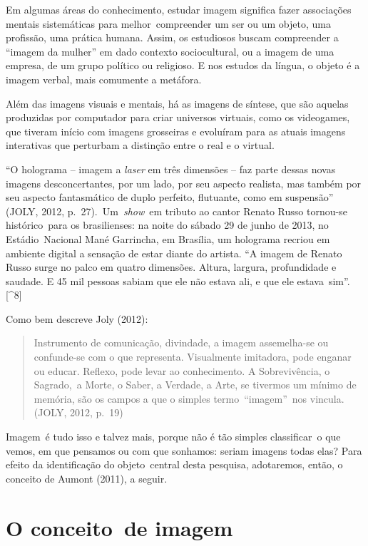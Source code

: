 \documentclass[
  letterpaper,
]{scrbook}
\begin{document}
Em algumas áreas do conhecimento, estudar imagem significa fazer
associações mentais sistemáticas para melhor~compreender um ser ou um
objeto, uma profissão, uma prática humana. Assim, os estudiosos buscam
compreender a ``imagem da mulher'' em dado contexto sociocultural, ou a
imagem de uma empresa, de um grupo político ou religioso. E nos estudos
da língua, o objeto é a imagem verbal, mais comumente a metáfora.~

Além das imagens visuais e mentais, há as imagens de síntese, que são
aquelas produzidas por computador para criar universos virtuais, como os
videogames, que tiveram início com imagens grosseiras e evoluíram para
as atuais imagens interativas que perturbam a distinção entre o real e o
virtual.

``O holograma -- imagem a \emph{laser} em três dimensões -- faz parte
dessas novas imagens desconcertantes, por um lado, por seu aspecto
realista, mas também por seu aspecto fantasmático de duplo perfeito,
flutuante, como em suspensão'' (JOLY, 2012, p.~27).~Um~\emph{show}~em
tributo ao cantor Renato Russo tornou-se histórico~para os brasilienses:
na noite do sábado 29 de junho de 2013, no Estádio~Nacional Mané
Garrincha, em Brasília, um holograma recriou em ambiente digital a
sensação de estar diante do artista. ``A imagem de Renato Russo surge no
palco em quatro dimensões. Altura, largura, profundidade e saudade. E 45
mil pessoas sabiam que ele não estava ali, e que ele
estava~sim''.{[}\^{}8{]}

Como bem descreve Joly (2012):~

\begin{quote}
Instrumento de comunicação, divindade, a imagem assemelha-se ou
confunde-se com o que representa. Visualmente imitadora, pode enganar ou
educar. Reflexo, pode levar ao conhecimento. A Sobrevivência, o
Sagrado,~a Morte, o Saber, a Verdade, a Arte, se tivermos um mínimo de
memória, são os campos a que o simples termo~``imagem''~nos vincula.
(JOLY, 2012, p.~19)~ ~
\end{quote}

Imagem~é tudo isso e talvez mais, porque não é tão simples classificar~o
que vemos, em que pensamos ou com que sonhamos: seriam imagens todas
elas? Para efeito da identificação do objeto~central desta pesquisa,
adotaremos, então, o conceito de Aumont (2011), a seguir. ~

\hypertarget{o-conceito-de-imagem}{%
\section{O conceito~de imagem}\label{o-conceito-de-imagem}}
\end{document}
